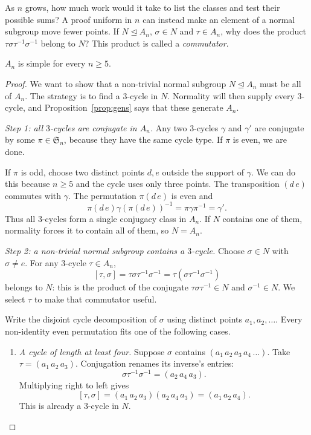 \begin{think}
As $n$ grows, how much work would it take to list the classes and test their possible sums? A proof uniform in $n$ can instead make an element of a normal subgroup move fewer points. If $N\trianglelefteq A_n$, $\sigma\in N$ and $\tau\in A_n$, why does the product $\tau\sigma\tau^{-1}\sigma^{-1}$ belong to $N$? This product is called a \emph{commutator}.
\end{think}

\begin{theorem}\label{thm:an}
$A_n$ is simple for every $n\ge5$.
\end{theorem}
\begin{proof}
We want to show that a non-trivial normal subgroup
$N\trianglelefteq A_n$ must be all of $A_n$.
The strategy is to find a $3$-cycle in $N$.
Normality will then supply every $3$-cycle,
and Proposition~\ref{prop:gens} says that these
generate $A_n$.

\emph{Step 1: all $3$-cycles are conjugate in $A_n$.}
Any two $3$-cycles $\gamma$ and $\gamma'$ are
conjugate by some $\pi\in\mathfrak S_n$,
because they have the same cycle type.
If $\pi$ is even, we are done.

If $\pi$ is odd, choose two distinct points
$d,e$ outside the support of $\gamma$.
We can do this because $n\ge5$ and the
cycle uses only three points. The
transposition $(d\,e)$ commutes with $\gamma$.
The permutation $\pi(d\,e)$ is even and
\[
\pi(d\,e)\gamma(\pi(d\,e))^{-1}
=\pi\gamma\pi^{-1}=\gamma'.
\]
Thus all $3$-cycles form a single conjugacy
class in $A_n$. If $N$ contains one of them,
normality forces it to contain all of them,
so $N=A_n$.

\emph{Step 2: a non-trivial normal subgroup
contains a $3$-cycle.}
Choose $\sigma\in N$ with $\sigma\ne e$.
For any $3$-cycle $\tau\in A_n$,
\[
[\tau,\sigma]=\tau\sigma\tau^{-1}\sigma^{-1}
=\tau(\sigma\tau^{-1}\sigma^{-1})
\]
belongs to $N$: this is the product of the
conjugate $\tau\sigma\tau^{-1}\in N$
and $\sigma^{-1}\in N$. We select $\tau$
to make that commutator useful.

Write the disjoint cycle decomposition of $\sigma$
using distinct points $a_1,a_2,\ldots$.
Every non-identity even permutation fits
one of the following cases.

\begin{enumerate}[label=(\arabic*)]
\item \emph{A cycle of length at least four.}
Suppose $\sigma$ contains
$(a_1\,a_2\,a_3\,a_4\,\ldots)$.
Take $\tau=(a_1\,a_2\,a_3)$.
Conjugation renames its inverse's entries:
\[
\sigma\tau^{-1}\sigma^{-1}
=(a_2\,a_4\,a_3).
\]
Multiplying right to left gives
\[
[\tau,\sigma]
=(a_1\,a_2\,a_3)(a_2\,a_4\,a_3)
=(a_1\,a_2\,a_4).
\]
This is already a $3$-cycle in $N$.


\end{enumerate}
\end{proof}
